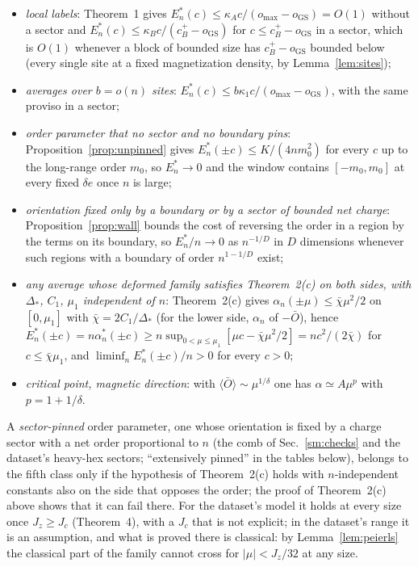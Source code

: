 \documentclass[aps,prx,onecolumn,10pt,nofootinbib,longbibliography,floatfix]{revtex4-2}
\theoremstyle{remark}
\newcommand{\Jz}{J_z}
\newcommand{\de}{\delta e}
\newcommand{\GS}{\mathrm{GS}}
\begin{document}
\begin{itemize}
\item \emph{local labels}: Theorem~1 gives $E^*_n(c)\le\kappa_A c/(o_{\max}-o_\GS)=O(1)$ without a sector and %
$E^*_n(c)\le\kappa_B c/(c_B^+-o_\GS)$ for $c\le c_B^+-o_\GS$ in a sector, which is $O(1)$ whenever a block of bounded
size has $c_B^+-o_\GS$ bounded below (every single site at a fixed magnetization density, by Lemma~\ref{lem:sites});
\item \emph{averages over $b=o(n)$ sites}: $E^*_n(c)\le b\kappa_1c/(o_{\max}-o_\GS)$, with the same proviso in a sector; %
\item \emph{order parameter that no sector and no boundary pins}: Proposition~\ref{prop:unpinned} gives
$E^*_n(\pm c)\le K/(4nm_0^2)$ for every $c$ up to the long-range order $m_0$, so $E^*_n\to0$ and the window contains
$[-m_0,m_0]$ at every fixed $\de$ once $n$ is large; %
\item \emph{orientation fixed only by a boundary or by a sector of bounded net charge}: Proposition~\ref{prop:wall}
bounds the cost of reversing the order in a region by the terms on its boundary, so $E^*_n/n\to0$ as $n^{-1/D}$ in
$D$ dimensions whenever such regions with a boundary of order $n^{1-1/D}$ exist; %
\item \emph{any average whose deformed family satisfies Theorem~2(c) on both sides, with $\Delta_*$, $C_1$, $\mu_1$ %
independent of $n$}: Theorem~2(c) gives $\alpha_n(\pm\mu)\le\bar\chi\mu^2/2$ on $[0,\mu_1]$ with %
$\bar\chi=2C_1/\Delta_*$ (for the lower side, $\alpha_n$ of $-\bar O$), hence
$E^*_n(\pm c)=n\alpha_n^*(\pm c)\ge n\sup_{0<\mu\le\mu_1}[\mu c-\bar\chi\mu^2/2]=nc^2/(2\bar\chi)$ for %
$c\le\bar\chi\mu_1$, and $\liminf_nE^*_n(\pm c)/n>0$ for every $c>0$; %
\item \emph{critical point, magnetic direction}: with $\langle\bar O\rangle\sim\mu^{1/\delta}$ one has %
$\alpha\simeq A\mu^{p}$ with $p=1+1/\delta$. %
\end{itemize}
A \emph{sector-pinned} order parameter, one whose orientation is fixed by a charge sector with a net order
proportional to $n$ (the comb of Sec.~\ref{sm:checks} and the dataset's heavy-hex sectors; ``extensively pinned'' in
the tables below), belongs to the fifth class only if the hypothesis of Theorem~2(c) holds with $n$-independent %
constants also on the side that opposes the order; the proof of Theorem~2(c) above shows that it can fail there. %
For the dataset's model it holds at every size once $\Jz\ge J_c$ (Theorem~4), with a $J_c$ that is not explicit; in %
the dataset's range it is an assumption, and what is proved there is classical: by Lemma~\ref{lem:peierls} the
classical part of the family cannot cross for $|\mu|<\Jz/32$ at any size. %
\end{document}

